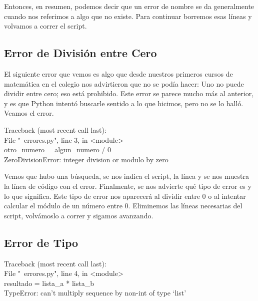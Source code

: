 \documentclass[10pt,letterpaper]{article}
\newenvironment{Code}
{
\begin{lrbox}{\selvestebox}%
\begin{minipage}{\dimexpr\columnwidth-2\fboxsep\relax}
\fontfamily{\ttdefault}\selectfont
}
{\end{minipage}\end{lrbox}%
\begin{center}
\colorbox{light-gray}{\usebox{\selvestebox}}
\end{center}
}
\begin{document}
Entonces, en resumen, podemos decir que un error de nombre se da generalmente cuando nos referimos a algo que no existe. Para continuar borremos esas l\'ineas y volvamos a correr el script.

\subsection{Error de Divisi\'on entre Cero}
El siguiente error que vemos es algo que desde nuestros primeros cursos de matem\'atica en el colegio nos advirtieron que no se pod\'ia hacer: Uno no puede dividir entre cero; eso est\'a prohibido. Este error se parece mucho m\'as al anterior, y es que Python intent\'o buscarle sentido a lo que hicimos, pero no se lo hall\'o. Veamos el error.

\begin{Code}
{\color{red}Traceback (most recent call last):\\
\hspace*{4mm} File "\ \hspace{-2mm}errores.py", line 3, in <module>\\
\hspace*{8mm} otro\_numero = algun\_numero / 0\\
ZeroDivisionError: integer division or modulo by zero}
\end{Code}

Vemos que hubo una b\'usqueda, se nos indica el script, la l\'inea y se nos muestra la l\'inea de c\'odigo con el error. Finalmente, se nos advierte qu\'e tipo de error es y lo que significa. Este tipo de error nos aparecer\'a al dividir entre 0 o al intentar calcular el m\'odulo de un n\'umero entre 0. Eliminemos las l\'ineas necesarias del script, volv\'amoslo a correr y sigamos avanzando.

\subsection{Error de Tipo}

\begin{Code}
{\color{red}Traceback (most recent call last):\\
\hspace*{4mm} File "\ \hspace{-2mm}errores.py", line 4, in <module>\\
\hspace*{8mm} resultado = lista\_a * lista\_b\\
TypeError: can't multiply sequence by non-int of type `list'}
\end{Code}
\end{document}
